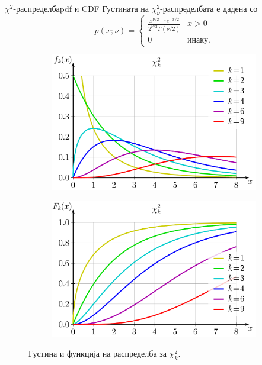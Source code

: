 \documentclass[hyperref={unicode}, xcolor={svgnames, table},
usepdftitle=false]{beamer}
\theoremstyle{remark}
\begin{document}
\begin{frame}{\(\chi^2\)-распределба}{pdf и CDF}
  Густината на \(\chi^2_{\nu}\)-распределбата е дадена со
  \[
    p(x; \nu) =
    \begin{cases}
      \frac{x^{\nu / {2} - 1} e^{-x / {2}}}{2^{\nu / {2}} \Gamma(\nu / {2})} & x
      > 0
      \\
      0 & \text{инаку.}
    \end{cases}
  \]
  \begin{figure}
    \centering
    \begin{subfigure}[b]{.475\linewidth}
      \includegraphics[width=\textwidth]{chi-square_pdf.pdf}
    \end{subfigure}
    \begin{subfigure}[b]{.475\linewidth}
      \includegraphics[width=\textwidth]{chi-square_CDF.pdf}
    \end{subfigure}
    \caption{Густина и функција на распределба за \(\chi^2_k\).}
  \end{figure}
\end{frame}
\end{document}
